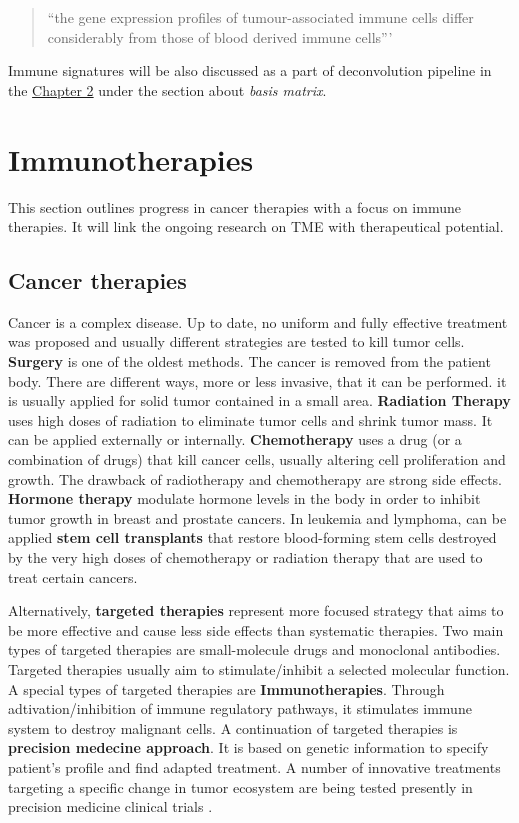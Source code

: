 \documentclass[12pt,]{book}
\theoremstyle{definition}
\theoremstyle{definition}
\theoremstyle{definition}
\theoremstyle{remark}
\begin{document}
\begin{quote}
``the gene expression profiles of tumour-associated immune cells differ
considerably from those of blood derived immune cells'''
\citep{Schelker2017}
\end{quote}

Immune signatures will be also discussed as a part of deconvolution
pipeline in the \protect\hyperlink{methods}{Chapter 2} under the section
about \emph{basis matrix}.

\hypertarget{immunotherapies}{%
\section{Immunotherapies}\label{immunotherapies}}

This section outlines progress in cancer therapies with a focus on
immune therapies. It will link the ongoing research on TME with
therapeutical potential.

\hypertarget{cancer_Therapies}{%
\subsection{Cancer therapies}\label{cancer_Therapies}}

Cancer is a complex disease. Up to date, no uniform and fully effective
treatment was proposed and usually different strategies are tested to
kill tumor cells. \textbf{Surgery} is one of the oldest methods. The
cancer is removed from the patient body. There are different ways, more
or less invasive, that it can be performed. it is usually applied for
solid tumor contained in a small area. \textbf{Radiation Therapy} uses
high doses of radiation to eliminate tumor cells and shrink tumor mass.
It can be applied externally or internally. \textbf{Chemotherapy} uses a
drug (or a combination of drugs) that kill cancer cells, usually
altering cell proliferation and growth. The drawback of radiotherapy and
chemotherapy are strong side effects. \textbf{Hormone therapy } modulate
hormone levels in the body in order to inhibit tumor growth in breast
and prostate cancers. In leukemia and lymphoma, can be applied
\textbf{stem cell transplants} that restore blood-forming stem cells
destroyed by the very high doses of chemotherapy or radiation therapy
that are used to treat certain cancers.

Alternatively, \textbf{targeted therapies} represent more focused
strategy that aims to be more effective and cause less side effects than
systematic therapies. Two main types of targeted therapies are
small-molecule drugs and monoclonal antibodies. Targeted therapies
usually aim to stimulate/inhibit a selected molecular function. A
special types of targeted therapies are \textbf{Immunotherapies}.
Through adtivation/inhibition of immune regulatory pathways, it
stimulates immune system to destroy malignant cells. A continuation of
targeted therapies is \textbf{precision medecine approach}. It is based
on genetic information to specify patient's profile and find adapted
treatment. A number of innovative treatments targeting a specific change
in tumor ecosystem are being tested presently in precision medicine
clinical trials \citep{NCI2018}.
\end{document}
